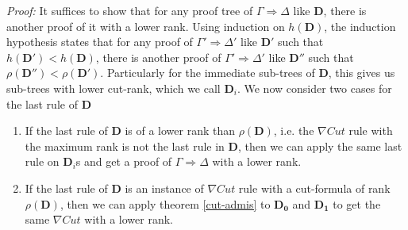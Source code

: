 \documentclass[a4paper, 12pt]{paper}
\begin{document}
\emph{Proof:} It suffices to show that for any proof tree of $\Gamma \Rightarrow \Delta$ like $\mathbf{D}$, there is another proof of it with a lower rank. Using induction on $h(\mathbf{D})$, the induction hypothesis states that for any proof of $\Gamma' \Rightarrow \Delta'$ like $\mathbf{D'}$ such that $h(\mathbf{D'}) < h(\mathbf{D})$, there is another proof of $\Gamma' \Rightarrow \Delta'$ like $\mathbf{D''}$ such that $\rho(\mathbf{D''}) < \rho(\mathbf{D'})$. Particularly for the immediate sub-trees of $\mathbf{D}$, this gives us sub-trees with lower cut-rank, which we call $\mathbf{D}_i$. We now consider two cases for the last rule of $\mathbf{D}$

\begin{enumerate}[label=\Roman*]
	\item If the last rule of $\mathbf{D}$ is of a lower rank than $\rho(\mathbf{D})$, i.e. the $\nabla Cut$ rule with the maximum rank is not the last rule in $\mathbf{D}$, then we can apply the same last rule on $\mathbf{D}_i$s and get a proof of $\Gamma \Rightarrow \Delta$ with a lower rank.
	
	\item If the last rule of $\mathbf{D}$ is an instance of $\nabla Cut$ rule with a cut-formula of rank $\rho(\mathbf{D})$, then we can apply theorem \ref{cut-admis} to $\mathbf{D_0}$ and $\mathbf{D_1}$ to get the same $\nabla Cut$ with a lower rank.
\end{enumerate}
\end{document}
